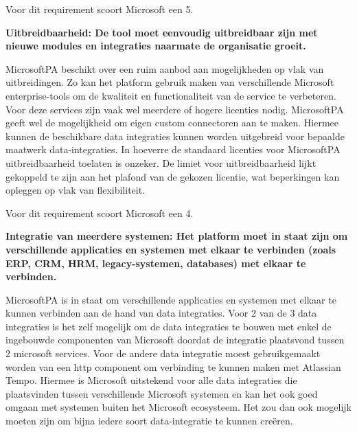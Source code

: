 Voor dit requirement scoort Microsoft een 5.

\vspace{\baselineskip}

\textbf{Uitbreidbaarheid: De tool moet eenvoudig uitbreidbaar zijn met nieuwe modules en integraties naarmate de organisatie groeit.}

\vspace{\baselineskip}

MicrosoftPA beschikt over een ruim aanbod aan mogelijkheden op vlak van uitbreidingen. Zo kan het platform gebruik maken van verschillende Microsoft enterprise-tools om de kwaliteit en functionaliteit van de service te verbeteren. Voor deze services zijn vaak wel meerdere of hogere licenties nodig. MicrosoftPA geeft wel de mogelijkheid om eigen custom connectoren aan te maken. Hiermee kunnen de beschikbare data integraties kunnen worden uitgebreid voor bepaalde maatwerk data-integraties. In hoeverre de standaard licenties voor MicrosoftPA uitbreidbaarheid toelaten is onzeker. De limiet voor uitbreidbaarheid lijkt gekoppeld te zijn aan het plafond van de gekozen licentie, wat beperkingen kan opleggen op vlak van flexibiliteit. 


Voor dit requirement scoort Microsoft een 4.


\vspace{\baselineskip}

\textbf{Integratie van meerdere systemen: Het platform moet in staat zijn om verschillende applicaties en systemen met elkaar te verbinden (zoals ERP, CRM, HRM, legacy-systemen, databases) met elkaar te verbinden.}

\vspace{\baselineskip}

MicrosoftPA is in staat om verschillende applicaties en systemen met elkaar te kunnen verbinden aan de hand van data integraties. Voor 2 van de 3 data integraties is het zelf mogelijk om de data integraties te bouwen met enkel de ingebouwde componenten van Microsoft doordat de integratie plaatsvond tussen 2 microsoft services. Voor de andere data integratie moest gebruikgemaakt worden van een http component om verbinding te kunnen maken met Atlassian Tempo. Hiermee is Microsoft uitstekend voor alle data integraties die plaatsvinden tussen verschillende Microsoft systemen en kan het ook goed omgaan met systemen buiten het Microsoft ecosysteem. Het zou dan ook mogelijk moeten zijn om bijna iedere soort data-integratie te kunnen creëren.

\vspace{\baselineskip}

